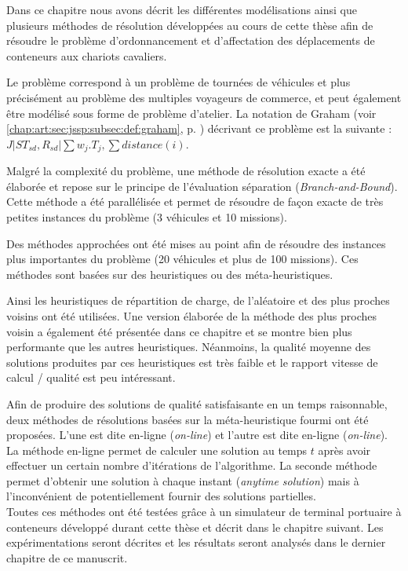 
Dans ce chapitre nous avons décrit les différentes modélisations ainsi que plusieurs méthodes de résolution développées au cours de cette thèse afin de résoudre le problème d'ordonnancement et d'affectation des déplacements de conteneurs aux chariots cavaliers.

Le problème correspond à un problème de tournées de véhicules et plus précisément au problème des multiples voyageurs de commerce, et peut également être modélisé sous forme de problème d'atelier. La notation de Graham (voir \ref{chap:art:sec:jssp:subsec:def:graham}, p. \pageref{chap:art:sec:jssp:subsec:def:graham}) décrivant ce problème est la suivante : ${ J|ST_{sd}, R_{sd}|\sum w_j.T_{j} , \sum distance(i)}$.

Malgré la complexité du problème, une méthode de résolution exacte a été élaborée et repose sur le principe de l'évaluation séparation (\textit{Branch-and-Bound}). Cette méthode a été parallélisée et permet de résoudre de façon exacte de très petites instances du problème (3 véhicules et 10 missions).

Des méthodes approchées ont été mises au point afin de résoudre des instances plus importantes du problème (20 véhicules et plus de 100 missions). Ces méthodes sont basées sur des heuristiques ou des méta-heuristiques. 

Ainsi les heuristiques de répartition de charge, de l'aléatoire et des plus proches voisins ont été utilisées. Une version élaborée de la méthode des plus proches voisin a également été présentée dans ce chapitre et se montre bien plus performante que les autres heuristiques. Néanmoins, la qualité moyenne des solutions produites par ces heuristiques est très faible et le rapport vitesse de calcul / qualité est peu intéressant. 

Afin de produire des solutions de qualité satisfaisante en un temps raisonnable, deux méthodes de résolutions basées sur la méta-heuristique fourmi ont été proposées. L'une est dite en-ligne (\textit{on-line}) et l'autre est dite en-ligne (\textit{on-line}). La méthode en-ligne permet de calculer une solution au temps $t$ après avoir effectuer un certain nombre d'itérations de l'algorithme. La seconde méthode permet d'obtenir une solution à chaque instant (\textit{anytime solution}) mais à l'inconvénient de potentiellement fournir des solutions partielles.\\

Toutes ces méthodes ont été testées grâce à un simulateur de terminal portuaire à conteneurs développé durant cette thèse et décrit dans le chapitre suivant. Les expérimentations seront décrites et les résultats seront analysés dans le dernier chapitre de ce manuscrit.